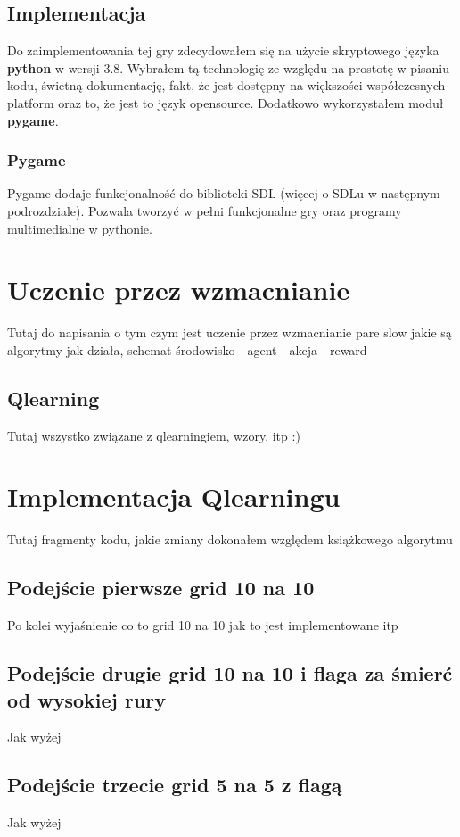 \documentclass[a4paper,12pt,oneside]{book}
\begin{document}
\section{Implementacja}
Do zaimplementowania tej gry zdecydowałem się na użycie skryptowego języka
\textbf{python} w wersji 3.8. Wybrałem tą technologię ze względu na prostotę w
pisaniu kodu, świetną dokumentację, fakt, że jest dostępny na większości
współczesnych platform oraz to, że jest to język open\dywiz source.
Dodatkowo wykorzystałem moduł \textbf{pygame}.
\subsection{Pygame}
Pygame dodaje funkcjonalność do biblioteki SDL (więcej o SDLu w następnym podrozdziale).
Pozwala tworzyć w pełni funkcjonalne gry oraz programy multimedialne w pythonie.




\chapter{Uczenie przez wzmacnianie}
Tutaj do napisania o tym czym jest uczenie przez wzmacnianie pare slow jakie są algorytmy
jak działa, schemat środowisko - agent - akcja - reward
\section{Q\dywiz learning}
Tutaj wszystko związane z qlearningiem, wzory, itp :)

\chapter{Implementacja Q\dywiz learningu}
Tutaj fragmenty kodu, jakie zmiany dokonałem względem książkowego algorytmu
\section{Podejście pierwsze grid 10 na 10}
Po kolei wyjaśnienie co to grid 10 na 10 jak to jest implementowane itp
\section{Podejście drugie grid 10 na 10 i flaga za śmierć od wysokiej rury}
Jak wyżej
\section{Podejście trzecie grid 5 na 5 z flagą}
Jak wyżej
\end{document}
